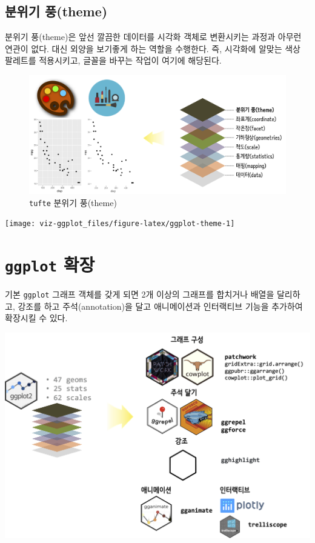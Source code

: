 \documentclass[
]{book}
\begin{document}
\hypertarget{ggplot2-steps-theme}{%
\subsection{분위기 풍(theme)}\label{ggplot2-steps-theme}}

분위기 풍(theme)은 앞선 깔끔한 데이터를 시각화 객체로 변환시키는 과정과 아무런 연관이 없다. 대신 외양을 보기좋게 하는 역할을 수행한다. 즉, 시각화에 알맞는 색상 팔레트를 적용시키고, 글꼴을 바꾸는 작업이 여기에 해당된다.

\begin{figure}
\centering
\includegraphics[width=1\textwidth,height=\textheight]{assets/images/ggplot-theme.png}
\caption{\texttt{tufte} 분위기 풍(theme)}
\end{figure}

\begin{center}\texttt{[image: viz-ggplot\_files/figure-latex/ggplot-theme-1]} \end{center}

\hypertarget{ggplot2-steps-extension}{%
\section{\texorpdfstring{\texttt{ggplot} 확장}{ggplot 확장}}\label{ggplot2-steps-extension}}

기본 \texttt{ggplot} 그래프 객체를 갖게 되면 2개 이상의 그래프를 합치거나 배열을 달리하고,
강조를 하고 주석(annotation)을 달고 애니메이션과 인터랙티브 기능을 추가하여 확장시킬 수 있다.

\includegraphics[width=1\textwidth,height=\textheight]{assets/images/ggplot-extension.png}
\end{document}
